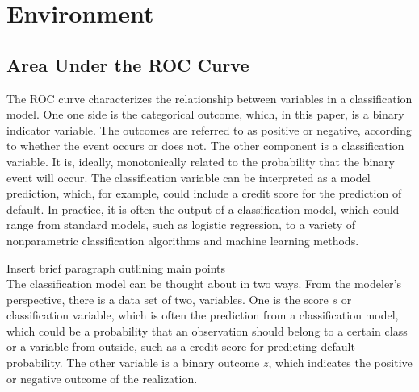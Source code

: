 



\section{Environment}
\subsection{Area Under the ROC Curve}


The ROC curve characterizes the relationship between variables in a classification model.
One one side is the categorical outcome, which, in this paper, is a binary indicator variable.
The outcomes are referred to as positive or negative, according to whether the event occurs or does not.
The other component is a classification variable.
It is, ideally, monotonically related to the probability that the binary event will occur.
The classification variable can be interpreted as a model prediction, which, for example, could include a credit score for the prediction of default.
In practice, it is often the output of a classification model, which could range from standard models, such as logistic regression, to a variety of nonparametric classification algorithms and machine learning methods.

{\Large Insert brief paragraph outlining main points} \\



The classification model can be thought about in two ways. 
From the modeler's perspective, there is a data set of two, variables. 
One is the score $s$ or classification variable, which is often the prediction from a classification model, which could be a probability that an observation should belong to a certain class or a variable from outside, such as a credit score for predicting default probability. 
The other variable is a binary outcome $z$, which indicates the positive or negative outcome of the realization. 

